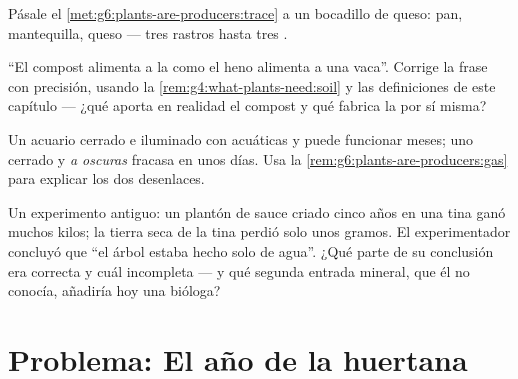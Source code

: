 \begin{exercise}[$\star\star$]\label{exo:g6:plants-are-producers:9}
Pásale el \cref{met:g6:plants-are-producers:trace} a un bocadillo de
queso: pan, mantequilla, queso --- tres rastros hasta tres .
\end{exercise}

\begin{exercise}[$\star\star$]\label{exo:g6:plants-are-producers:10}
``El compost alimenta a la  como el heno alimenta a una vaca''.
Corrige la frase con precisión, usando la
\cref{rem:g4:what-plants-need:soil} y las definiciones de este capítulo
--- ¿qué aporta en realidad el compost y qué fabrica la  por sí
misma?
\end{exercise}

\begin{exercise}[$\star\star$]\label{exo:g6:plants-are-producers:11}
Un acuario cerrado e iluminado con  acuáticas y  puede
funcionar meses; uno cerrado y \emph{a oscuras} fracasa en unos días.
Usa la \cref{rem:g6:plants-are-producers:gas} para explicar los dos
desenlaces.
\end{exercise}

\begin{exercise}[$\star\star\star$]\label{exo:g6:plants-are-producers:12}
Un experimento antiguo: un plantón de sauce criado cinco años en una
tina ganó muchos kilos; la tierra seca de la tina perdió solo unos
gramos. El experimentador concluyó que ``el árbol estaba hecho solo de
agua''. ¿Qué parte de su conclusión era correcta y cuál incompleta ---
y qué segunda entrada mineral, que él no conocía, añadiría hoy una
bióloga?
\end{exercise}

\section{Problema: El año de la huertana}


